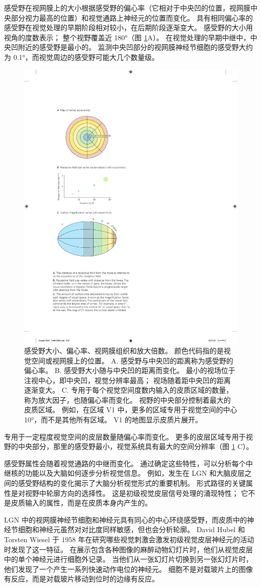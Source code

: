 感受野在视网膜上的大小根据感受野的偏心率（它相对于中央凹的位置，视网膜中央部分视力最高的位置）和视觉通路上神经元的位置而变化。 
具有相同偏心率的感受野在视觉处理的早期阶段相对较小，在后期阶段逐渐变大。 
感受野的大小用视角的度数表示； 整个视野覆盖近 180°（图 \ref{fig:21_10}A）。 
在视觉处理的早期中继中，中央凹附近的感受野是最小的。 
监测中央凹部分的视网膜神经节细胞的感受野大约为 0.1°，而视觉周边的感受野可能大几个数量级。

\begin{figure}[htbp]
	\centering
	\includegraphics[width=0.5\linewidth]{chap21/fig_21_10}
	\caption{感受野大小、偏心率、视网膜组织和放大倍数。 
		颜色代码指的是视觉空间或视网膜上的位置。 
		A. 感受野与中央凹的距离称为感受野的偏心率。 
		B. 感受野大小随与中央凹的距离而变化。 
		最小的视场位于注视中心，即中央凹，视觉分辨率最高； 
		视场随着距中央凹的距离逐渐变大。 
		C. 专用于每个视觉空间度数内输入的皮质区域的数量，称为放大因子，也随偏心率而变化。 
		视野的中央部分控制着最大的皮质区域。 
		例如，在区域 V1 中，更多的区域专用于视觉空间的中心 10°，而不是其他所有区域。 
		V1 的地图显示皮质片展开。}
	\label{fig:21_10}
\end{figure}

专用于一定程度视觉空间的皮层数量随偏心率而变化。 更多的皮层区域专用于视野的中央部分，那里的感受野最小，视觉系统具有最大的空间分辨率（图 \ref{fig:21_10} C）。

感受野属性会随着视觉通路的中继而变化。 
通过确定这些特性，可以分析每个中继核的功能以及大脑如何逐步分析视觉信息。 
例如，发生在 LGN 和大脑皮层之间的感受野结构的变化揭示了大脑分析视觉形式的重要机制。 
形式路径的关键属性是对视野中轮廓方向的选择性。 
这是初级视觉皮层信号处理的涌现特性； 
它不是皮质输入的属性，而是在皮质本身内产生的。


LGN 中的视网膜神经节细胞和神经元具有同心的中心环绕感受野，而皮质中的神经节细胞和神经元虽然对对比度同样敏感，但也会分析轮廓。 
David Hubel 和 Torsten Wiesel 于 1958 年在研究哪些视觉刺激会激发初级视觉皮层神经元的活动时发现了这一特征。 
在展示包含各种图像的麻醉动物幻灯片时，他们从视觉皮层中的单个神经元进行细胞外记录。 
当他们从一张幻灯片切换到另一张幻灯片时，他们发现了一个产生一系列快速动作电位的神经元。 
细胞不是对载玻片上的图像有反应，而是对载玻片移动到位时的边缘有反应。



